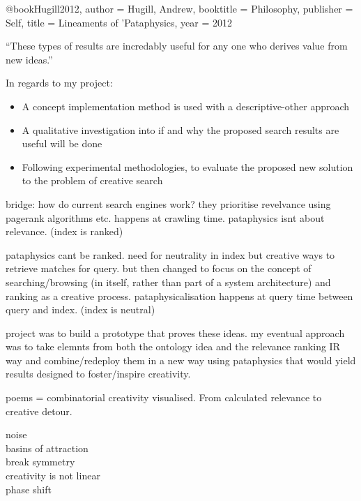 


\Forward
\MoveDown
\RewindToIndex
\ToTop
\ForwardToEnd
\MoveUp
\RewindToStart
\ForwardToIndex
\Rewind
\ToBottom

\bcloupe


@book{Hugill2012,
  author = {Hugill, Andrew},
  booktitle = {Philosophy},
  publisher = {Self},
  title = {{Lineaments of 'Pataphysics}},
  year = {2012}
}


``These types of results are incredably useful for any one who derives value from new ideas.''\autocite{Yossarian2015}

In regards to my project:
\begin{itemize}
  \item A concept implementation method is used with a descriptive-other approach
  \item A qualitative investigation into if and why the proposed search results are useful will be done
  \item Following experimental methodologies, to evaluate the proposed new solution to the problem of creative search
\end{itemize}


bridge: how do current search engines work? they prioritise revelvance using pagerank algorithms etc. happens at crawling time. pataphysics isnt about relevance. (index is ranked)

pataphysics cant be ranked. need for neutrality in index but creative ways to retrieve matches for query.
but then changed to focus on the concept of searching/browsing (in itself, rather than part of a system architecture) and ranking as a creative process.
pataphysicalisation happens at query time between query and index. (index is neutral)

project was to build a prototype that proves these ideas.
my eventual approach was to take elemnts from both the ontology idea and the relevance ranking IR way and combine/redeploy them in a new way using pataphysics that would yield results designed to foster/inspire creativity.



\begin{fcom}
  poems = combinatorial creativity visualised.
  From calculated relevance to creative detour.
\end{fcom}

\begin{fcom}
  noise\\
  basins of attraction\\
  break symmetry\\
  creativity is not linear\\
  phase shift\\
  \autocite{Everitt2011}
\end{fcom}

\grule
